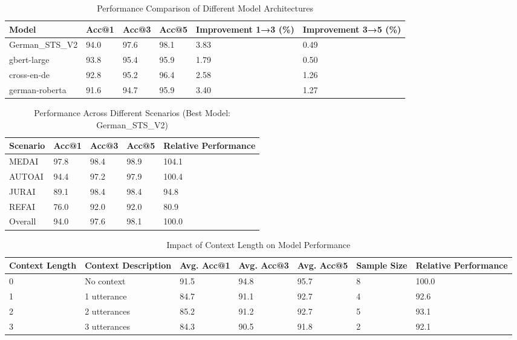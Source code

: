 
\begin{table}[htbp]
\centering
\caption{Performance Comparison of Different Model Architectures}
\label{tab:model_performance}
\begin{tabularx}{\textwidth}{lXXXXX}
\toprule
Model & Acc@1 & Acc@3 & Acc@5 & Improvement 1→3 (\%) & Improvement 3→5 (\%) \\
\midrule
German\_STS\_V2 & 94.0 & 97.6 & 98.1 & 3.83 & 0.49 \\
gbert-large & 93.8 & 95.4 & 95.9 & 1.79 & 0.50 \\
cross-en-de & 92.8 & 95.2 & 96.4 & 2.58 & 1.26 \\
german-roberta & 91.6 & 94.7 & 95.9 & 3.40 & 1.27 \\
\bottomrule
\end{tabularx}
\end{table}

\begin{table}[htbp]
\centering
\caption{Performance Across Different Scenarios (Best Model: German\_STS\_V2)}
\label{tab:scenario_performance}
\begin{tabularx}{\textwidth}{lXXXX}
\toprule
Scenario & Acc@1 & Acc@3 & Acc@5 & Relative Performance \\
\midrule
MEDAI & 97.8 & 98.4 & 98.9 & 104.1 \\
AUTOAI & 94.4 & 97.2 & 97.9 & 100.4 \\
JURAI & 89.1 & 98.4 & 98.4 & 94.8 \\
REFAI & 76.0 & 92.0 & 92.0 & 80.9 \\
Overall & 94.0 & 97.6 & 98.1 & 100.0 \\
\bottomrule
\end{tabularx}
\end{table}

\begin{table}[htbp]
\centering
\caption{Impact of Context Length on Model Performance}
\label{tab:context_impact}
\begin{tabularx}{\textwidth}{lXXXXXX}
\toprule
Context Length & Context Description & Avg. Acc@1 & Avg. Acc@3 & Avg. Acc@5 & Sample Size & Relative Performance \\
\midrule
0 & No context & 91.5 & 94.8 & 95.7 & 8 & 100.0 \\
1 & 1 utterance & 84.7 & 91.1 & 92.7 & 4 & 92.6 \\
2 & 2 utterances & 85.2 & 91.2 & 92.7 & 5 & 93.1 \\
3 & 3 utterances & 84.3 & 90.5 & 91.8 & 2 & 92.1 \\
\bottomrule
\end{tabularx}
\end{table}

